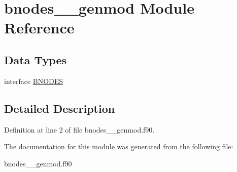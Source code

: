 \hypertarget{classbnodes____genmod}{\section{bnodes\+\_\+\+\_\+genmod Module Reference}
\label{classbnodes____genmod}
}
\subsection*{Data Types}
\begin{DoxyCompactItemize}
\item 
interface \hyperlink{interfacebnodes____genmod_1_1_b_n_o_d_e_s}{B\+N\+O\+D\+E\+S}
\end{DoxyCompactItemize}


\subsection{Detailed Description}


Definition at line 2 of file bnodes\+\_\+\+\_\+genmod.\+f90.



The documentation for this module was generated from the following file\+:\begin{DoxyCompactItemize}
\item 
bnodes\+\_\+\+\_\+genmod.\+f90\end{DoxyCompactItemize}
